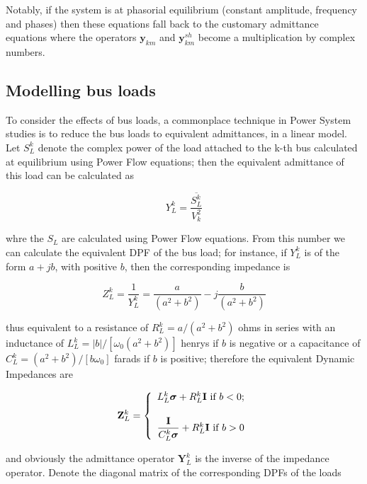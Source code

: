 	Notably, if the system is at phasorial equilibrium (constant amplitude, frequency and phases) then these equations fall back to the customary admittance equations where the operators $\mathbf{y}_{km}$ and $\mathbf{y}_{km}^{sh}$ become a multiplication by complex numbers.

\subsection{Modelling bus loads} %

	To consider the effects of bus loads, a commonplace technique in Power System studies is to reduce the bus loads to equivalent admittances, in a linear model. Let $S^k_L$ denote the complex power of the load attached to the k-th bus calculated at equilibrium using Power Flow equations; then the equivalent admittance of this load can be calculated as

\begin{equation} Y_L^k = \dfrac{\overline{S_L^k}}{V_k^2} \label{eq:load_eq_impedance} \end{equation}

	\noindent whre the $S_L$ are calculated using Power Flow equations. From this number we can calculate the equivalent DPF of the bus load; for instance, if $Y_L^k$ is of the form $a + jb$, with positive $b$, then the corresponding impedance is

\begin{equation} Z_L^k = \dfrac{1}{Y_L^k} = \dfrac{a}{\left(a^2 + b^2\right)} - j\dfrac{b}{\left(a^2 + b^2\right)} \end{equation}

	\noindent thus equivalent to a resistance of $R_L^k = a/(a^2 + b^2)$ ohms in series with an inductance of $L_L^k = \left\lvert b\right\rvert/[\omega_0(a^2 + b^2)]$ henrys if $b$ is negative or a capacitance of $C_L^k = (a^2 + b^2)/[b\omega_0]$ farads if $b$ is positive; therefore the equivalent Dynamic Impedances are

\begin{equation} \mathbf{Z}_L^k = \left\{\begin{array}{l} L_L^k\boldsymbol{\sigma} + R_L^k\mathbf{I} \text{ if } b < 0; \\[5mm] \dfrac{\mathbf{I}}{C_L^k\boldsymbol{\sigma}} + R_L^k\mathbf{I} \text{ if } b > 0 \end{array}\right.\end{equation}

	\noindent and obviously the admittance operator $\mathbf{Y}_L^k$ is the inverse of the impedance operator. Denote the diagonal matrix of the corresponding DPFs of the loads

